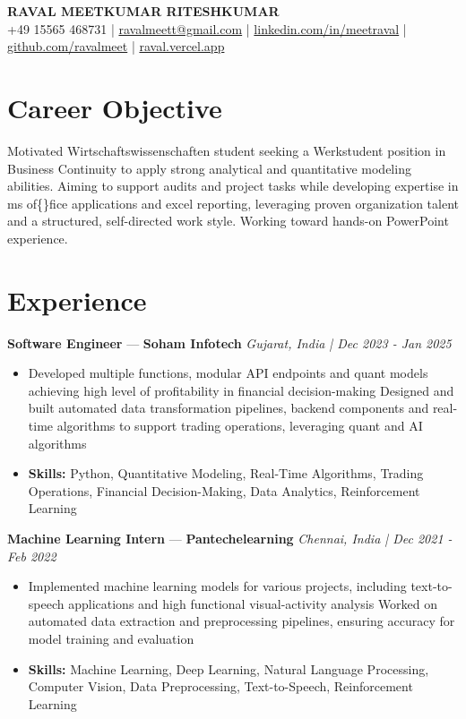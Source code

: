 \documentclass[a4paper,10pt]{article}
\begin{document}
\begin{center}
  {\Large\bfseries RAVAL MEETKUMAR RITESHKUMAR}\\[2pt]
  {\small +49 15565 468731 \;|\; \href{mailto:ravalmeett@gmail.com}{ravalmeett@gmail.com} \;|\; \href{https://www.linkedin.com/in/meetraval/}{linkedin.com/in/meetraval} \;|\; \href{https://github.com/ravalmeet}{github.com/ravalmeet} \;|\; \href{https://raval.vercel.app/}{raval.vercel.app}}
\end{center}
\vspace{-3pt}

\section*{Career Objective}
Motivated Wirtschaftswissenschaften student seeking a Werkstudent position in Business Continuity to apply strong analytical and quantitative modeling abilities. Aiming to support audits and project tasks while developing expertise in ms of\{\}fice applications and excel reporting, leveraging proven organization talent and a structured, self-directed work style. Working toward hands-on PowerPoint experience.\par

\section*{Experience}
\textbf{Software Engineer} — \textbf{Soham Infotech} \hfill \textit{Gujarat, India \;|\; Dec 2023 - Jan 2025}\par
\vspace{1pt}
\begin{itemize}
  \item Developed multiple functions, modular API endpoints and quant models achieving high level of profitability in financial decision-making Designed and built automated data transformation pipelines, backend components and real-time algorithms to support trading operations, leveraging quant and AI algorithms
  \item \textbf{Skills:} Python, Quantitative Modeling, Real-Time Algorithms, Trading Operations, Financial Decision-Making, Data Analytics, Reinforcement Learning
\end{itemize}
\vspace{3pt}
\textbf{Machine Learning Intern} — \textbf{Pantechelearning} \hfill \textit{Chennai, India \;|\; Dec 2021 - Feb 2022}\par
\vspace{1pt}
\begin{itemize}
  \item Implemented machine learning models for various projects, including text-to-speech applications and high functional visual-activity analysis Worked on automated data extraction and preprocessing pipelines, ensuring accuracy for model training and evaluation
  \item \textbf{Skills:} Machine Learning, Deep Learning, Natural Language Processing, Computer Vision, Data Preprocessing, Text-to-Speech, Reinforcement Learning
\end{itemize}
\end{document}
